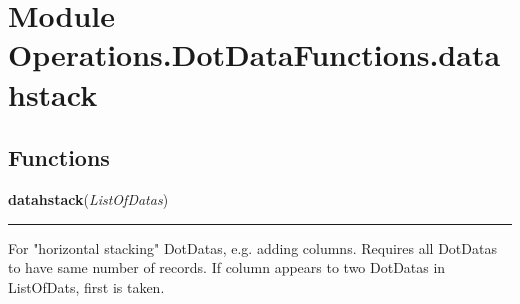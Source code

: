 %
%
%


\section{Module Operations.DotDataFunctions.datahstack}

    \label{Operations:DotDataFunctions:datahstack}


  \subsection{Functions}

    \label{Operations:DotDataFunctions:datahstack:datahstack}

    \vspace{0.5ex}

\hspace{.8\funcindent}\begin{boxedminipage}{\funcwidth}

    \raggedright \textbf{datahstack}(\textit{ListOfDatas})

    \vspace{-1.5ex}

    \rule{\textwidth}{0.5\fboxrule}
\setlength{\parskip}{2ex}
    For "horizontal stacking" DotDatas, e.g. adding columns. Requires all 
    DotDatas to have same number of records. If column appears to two 
    DotDatas in ListOfDats, first is taken.

\setlength{\parskip}{1ex}
    \end{boxedminipage}

